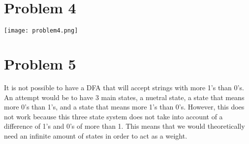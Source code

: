 \documentclass[12pt]{article}
\begin{document}
\newpage
\section*{Problem 4}
\texttt{[image: problem4.png]}

\newpage
\section*{Problem 5}
It is not possible to have a DFA that will accept strings with more 1's than 0's. An attempt
would be to have 3 main states, a nuetral state, a state that means more 0's than 1's, and 
a state that means more 1's than 0's. However, this does not work because this three state system
does not take into account of a difference of 1's and 0's of more than 1. This means that we would
theoretically need an infinite amount of states in order to act as a weight. 
\end{document}
